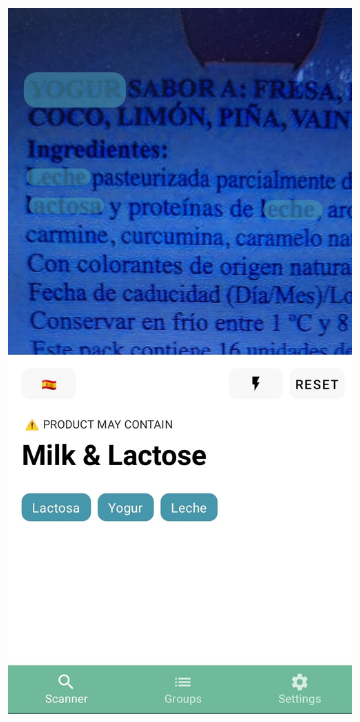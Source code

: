 \begin{figure}[h]
    \centering
    \begin{subfigure}{0.3\textwidth}
        \centering
        \includegraphics[width=0.9\linewidth]{Figures/soosee-1.jpg}
        \caption{}
        \label{fig:soosee-1}
    \end{subfigure}
    \begin{subfigure}{0.3\textwidth}
        \centering

\end{subfigure}
\end{figure}
